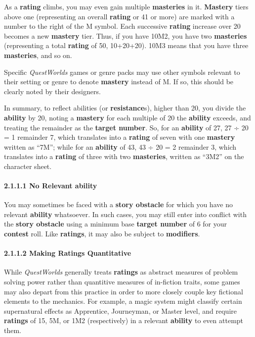 \documentclass[
]{article}
\begin{document}
As a \textbf{rating} climbs, you may even gain multiple
\textbf{masteries} in it. \textbf{Mastery} tiers above one (representing
an overall \textbf{rating} or 41 or more) are marked with a number to
the right of the M symbol. Each successive \textbf{rating} increase over
20 becomes a new \textbf{mastery} tier. Thus, if you have 10M2, you have
two \textbf{masteries} (representing a total \textbf{rating} of 50,
10+20+20). 10M3 means that you have three \textbf{masteries}, and so on.

Specific \emph{QuestWorlds} games or genre packs may use other symbols
relevant to their setting or genre to denote \textbf{mastery} instead of
M. If so, this should be clearly noted by their designers.

In summary, to reflect abilities (or \textbf{resistance}s), higher than
20, you divide the \textbf{ability} by 20, noting a \textbf{mastery} for
each multiple of 20 the \textbf{ability} exceeds, and treating the
remainder as the \textbf{target number}. So, for an \textbf{ability} of
27, 27 ÷ 20 = 1 remainder 7, which translates into a \textbf{rating} of
seven with one \textbf{mastery} written as ``7M''; while for an
\textbf{ability} of 43, 43 ÷ 20 = 2 remainder 3, which translates into a
\textbf{rating} of three with two \textbf{masteries}, written as ``3M2''
on the character sheet.

\hypertarget{no-relevant-ability}{%
\paragraph{\texorpdfstring{2.1.1.1 No Relevant
\textbf{ability}}{2.1.1.1 No Relevant ability}}\label{no-relevant-ability}}

You may sometimes be faced with a \textbf{story obstacle} for which you
have no relevant \textbf{ability} whatsoever. In such cases, you may
still enter into conflict with the \textbf{story obstacle} using a
minimum base \textbf{target number} of 6 for your \textbf{contest} roll.
Like \textbf{ratings}, it may also be subject to \textbf{modifiers}.

\hypertarget{making-ratings-quantitative}{%
\paragraph{2.1.1.2 Making Ratings
Quantitative}\label{making-ratings-quantitative}}

While \emph{QuestWorlds} generally treats \textbf{ratings} as abstract
measures of problem solving power rather than quantitive measures of
in-fiction traits, some games may also depart from this practice in
order to more closely couple key fictional elements to the mechanics.
For example, a magic system might classify certain supernatural effects
as Apprentice, Journeyman, or Master level, and require \textbf{ratings}
of 15, 5M, or 1M2 (respectively) in a relevant \textbf{ability} to even
attempt them.
\end{document}
